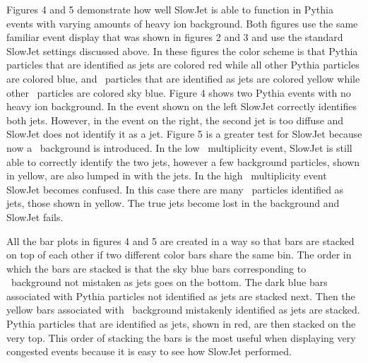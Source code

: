 \documentclass[11pt]{article}
\begin{document}
Figures 4 and 5 demonstrate how well SlowJet is able to function in Pythia events with varying amounts of heavy ion background. Both figures use the same familiar event display that was shown in figures 2 and 3 and use the standard SlowJet settings discussed above. In these figures the color scheme is that Pythia particles that are identified as jets are colored red while all other Pythia particles are colored blue, and \trento\ particles that are identified as jets are colored yellow while other \trento\ particles are colored sky blue. Figure 4 shows two Pythia events with no heavy ion background. In the event shown on the left SlowJet correctly identifies both jets. However, in the event on the right, the second jet is too diffuse and SlowJet does not identify it as a jet. Figure 5 is a greater test for SlowJet because now a \trento\ background is introduced. In the low \trento\ multiplicity event, SlowJet is still able to correctly identify the two jets, however a few background particles, shown in yellow, are also lumped in with the jets.  In the high \trento\ multiplicity event SlowJet becomes confused. In this case there are many \trento\ particles identified as jets, those shown in yellow. The true jets become lost in the background and SlowJet fails.

All the bar plots in figures 4 and 5 are created in a way so that bars are stacked on top of each other if two different color bars share the same bin. The order in which the bars are stacked is that the sky blue bars corresponding to \trento\ background not mistaken as jets goes on the bottom. The dark blue bars associated with Pythia particles not identified as jets are stacked next. Then the yellow bars associated with \trento\ background mistakenly identified as jets are stacked. Pythia particles that are identified as jets, shown in red, are then stacked on the very top. This order of stacking the bars is the most useful when displaying very congested events because it is easy to see how SlowJet performed.
\end{document}
